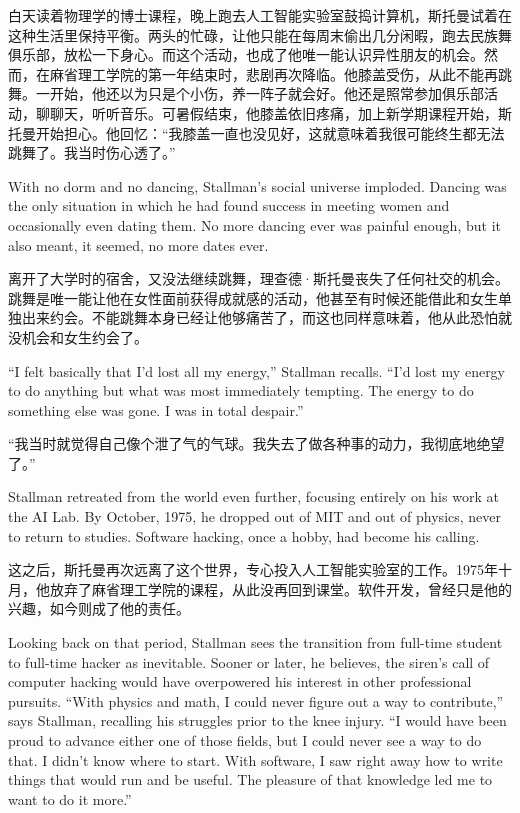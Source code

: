 \ifdefined\chs
白天读着物理学的博士课程，晚上跑去人工智能实验室鼓捣计算机，斯托曼试着在这种生活里保持平衡。两头的忙碌，让他只能在每周末偷出几分闲暇，跑去民族舞俱乐部，放松一下身心。而这个活动，也成了他唯一能认识异性朋友的机会。然而，在麻省理工学院的第一年结束时，悲剧再次降临。他膝盖受伤，从此不能再跳舞。一开始，他还以为只是个小伤，养一阵子就会好。他还是照常参加俱乐部活动，聊聊天，听听音乐。可暑假结束，他膝盖依旧疼痛，加上新学期课程开始，斯托曼开始担心。他回忆：``我膝盖一直也没见好，这就意味着我很可能终生都无法跳舞了。我当时伤心透了。''
\fi

\ifdefined\eng
With no dorm and no dancing, Stallman's social universe imploded. Dancing was the only situation in which he had found success in meeting women and occasionally even dating them. No more dancing ever was painful enough, but it also meant, it seemed, no more dates ever.
\fi

\ifdefined\chs
离开了大学时的宿舍，又没法继续跳舞，理查德·斯托曼丧失了任何社交的机会。跳舞是唯一能让他在女性面前获得成就感的活动，他甚至有时候还能借此和女生单独出来约会。不能跳舞本身已经让他够痛苦了，而这也同样意味着，他从此恐怕就没机会和女生约会了。
\fi

\ifdefined\eng
``I felt basically that I'd lost all my energy,'' Stallman recalls. ``I'd lost my energy to do anything but what was most immediately tempting. The energy to do something else was gone. I was in total despair.''
\fi

\ifdefined\chs
``我当时就觉得自己像个泄了气的气球。我失去了做各种事的动力，我彻底地绝望了。''
\fi

\ifdefined\eng
Stallman retreated from the world even further, focusing entirely on his work at the AI Lab. By October, 1975, he dropped out of MIT and out of physics, never to return to studies. Software hacking, once a hobby, had become his calling.
\fi

\ifdefined\chs
这之后，斯托曼再次远离了这个世界，专心投入人工智能实验室的工作。1975年十月，他放弃了麻省理工学院的课程，从此没再回到课堂。软件开发，曾经只是他的兴趣，如今则成了他的责任。
\fi

\ifdefined\eng
Looking back on that period, Stallman sees the transition from full-time student to full-time hacker as inevitable. Sooner or later, he believes, the siren's call of computer hacking would have overpowered his interest in other professional pursuits. ``With physics and math, I could never figure out a way to contribute,'' says Stallman, recalling his struggles prior to the knee injury. ``I would have been proud to advance either one of those fields, but I could never see a way to do that. I didn't know where to start. With software, I saw right away how to write things that would run and be useful. The pleasure of that knowledge led me to want to do it more.''
\fi

